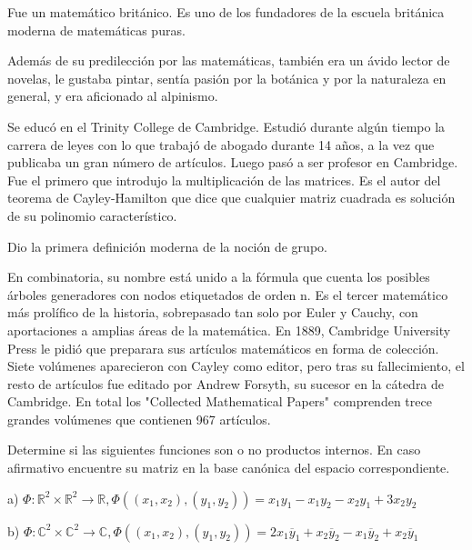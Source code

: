 \begin{parchment}{ Fue un matemático británico. Es uno de los fundadores de la escuela británica moderna de matemáticas puras.

Además de su predilección por las matemáticas, también era un ávido lector de novelas, le gustaba pintar, sentía pasión por la botánica y por la naturaleza en general, y era aficionado al alpinismo.

Se educó en el Trinity College de Cambridge. Estudió durante algún tiempo la carrera de leyes con lo que trabajó de abogado durante 14 años, a la vez que publicaba un gran número de artículos. Luego pasó a ser profesor en Cambridge. Fue el primero que introdujo la multiplicación de las matrices. Es el autor del teorema de Cayley-Hamilton que dice que cualquier matriz cuadrada es solución de su polinomio característico.

Dio la primera definición moderna de la noción de grupo.

En combinatoria, su nombre está unido a la fórmula  que cuenta los posibles árboles generadores con nodos etiquetados de orden n.
Es el tercer matemático más prolífico de la historia, sobrepasado tan solo por Euler y Cauchy, con aportaciones a amplias áreas de la matemática. En 1889, Cambridge University Press le pidió que preparara sus artículos matemáticos en forma de colección. Siete volúmenes aparecieron con Cayley como editor, pero tras su fallecimiento, el resto de artículos fue editado por Andrew Forsyth, su sucesor en la cátedra de Cambridge. En total los "Collected Mathematical Papers" comprenden trece grandes volúmenes que contienen 967 artículos.}
\end{parchment}














\begin{exercise}
\item

Determine si las siguientes funciones son o no productos internos. En caso afirmativo encuentre su matriz en la base canónica del espacio correspondiente.

a) $\Phi:\mathbb{R}^2 \times \mathbb{R}^2  \rightarrow \mathbb{R}, \Phi ((x_1,x_2),(y_1,y_2))= x_1y_1-x_1y_2-x_2y_1+3x_2y_2$

b) $\Phi:\mathbb{C}^2 \times \mathbb{C}^2  \rightarrow \mathbb{C}, \Phi ((x_1,x_2),(y_1,y_2))= 2x_1 \overline y_1+x_2 \overline y_2-x_1 \overline y_2+x_2 \overline y_1$
\end{exercise}







